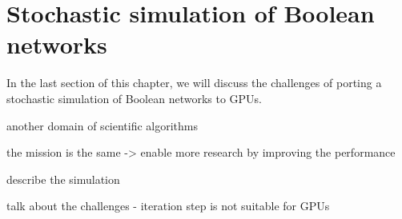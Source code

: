 \section{Stochastic simulation of Boolean networks}

In the last section of this chapter, we will discuss the challenges of porting a stochastic simulation of Boolean networks to GPUs. 

another domain of scientific algorithms

the mission is the same -> enable more research by improving the performance

describe the simulation

talk about the challenges  
- iteration step is not suitable for GPUs 





















